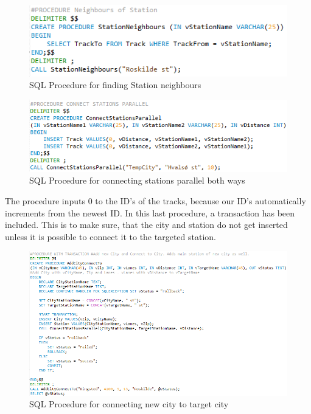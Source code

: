 \begin{figure}[ht!]
    \centering
    \includegraphics[width=1\textwidth]{img/SQL_PROCEDURE_Neighbours}
    \caption{SQL Procedure for finding Station neighbours}
\end{figure}

\begin{figure}[ht!]
    \centering
    \includegraphics[width=1\textwidth]{img/SQL_PROCEDURE_ConnectParallel}
    \caption{SQL Procedure for connecting stations parallel both ways}
\end{figure}

The procedure inputs 0 to the ID's of the tracks, because our ID's automatically increments from the newest ID.
\newpage
In this last procedure, a transaction has been included. This is to make sure, that the city and station do not get inserted unless it is possible to connect it to the targeted station.

\begin{figure}[ht!]
    \centering
    \includegraphics[width=1\textwidth]{img/SQL_PROCEDURE_AddCityConnect}
    \caption{SQL Procedure for connecting new city to target city}
\end{figure}

